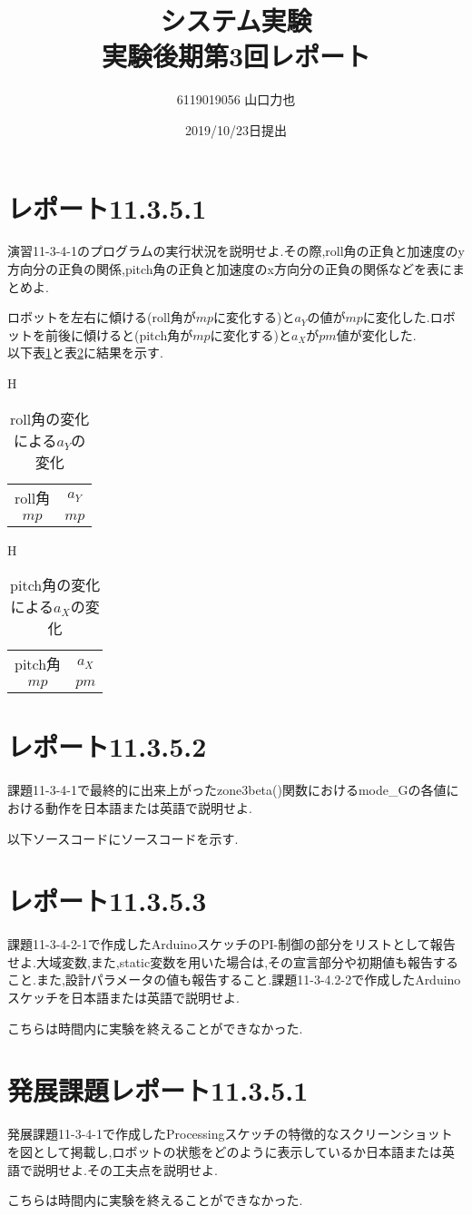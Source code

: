 \documentclass{jarticle}
\title{{システム実験}\\実験後期第3回レポート}
\author{6119019056 山口力也}
\date{2019/10/23日提出}
\begin{document}
\maketitle
\section{レポート11.3.5.1}
演習11-3-4-1のプログラムの実行状況を説明せよ.その際,roll角の正負と加速度のy方向分の正負の関係,pitch角の正負と加速度のx方向分の正負の関係などを表にまとめよ.

ロボットを左右に傾ける(roll角が$mp$に変化する)と$a_Y$の値が$mp$に変化した.ロボットを前後に傾けると(pitch角が$mp$に変化する)と$a_X$が$pm$値が変化した. \\
以下表\ref{tb:roll}と表\ref{tb:pitch}に結果を示す.
\begin{table}{H}
\caption{roll角の変化による$a_Y$の変化}
\label{tb:roll}
    \begin{tabular}{c|c} \\
    roll角 & $a_Y$ \\
    $mp$ & $mp$ 
    \end{tabular}
\end{table}

\begin{table}{H}
\caption{pitch角の変化による$a_X$の変化}
\label{tb:pitch}
    \begin{tabular}{c|c} \\
    pitch角 & $a_X$ \\
    $mp$ & $pm$ 
    \end{tabular}
\end{table}

\section{レポート11.3.5.2}

課題11-3-4-1で最終的に出来上がったzone3beta()関数におけるmode\_Gの各値における動作を日本語または英語で説明せよ.

以下ソースコードにソースコードを示す.




\section{レポート11.3.5.3}
課題11-3-4-2-1で作成したArduinoスケッチのPI-制御の部分をリストとして報告せよ.大域変数,また,static変数を用いた場合は,その宣言部分や初期値も報告すること.また,設計パラメータの値も報告すること.課題11-3-4.2-2で作成したArduinoスケッチを日本語または英語で説明せよ.

こちらは時間内に実験を終えることができなかった.
\section{発展課題レポート11.3.5.1}
発展課題11-3-4-1で作成したProcessingスケッチの特徴的なスクリーンショットを図として掲載し,ロボットの状態をどのように表示しているか日本語または英語で説明せよ.その工夫点を説明せよ.

こちらは時間内に実験を終えることができなかった.
\end{document}
